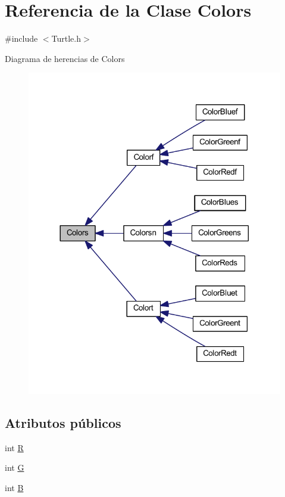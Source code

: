 \hypertarget{class_colors}{}\section{Referencia de la Clase Colors}
\label{class_colors}


{\ttfamily \#include $<$Turtle.\+h$>$}



Diagrama de herencias de Colors
\nopagebreak
\begin{figure}[H]
\begin{center}
\leavevmode
\includegraphics[width=317pt]{class_colors__inherit__graph}
\end{center}
\end{figure}
\subsection*{Atributos públicos}
\begin{DoxyCompactItemize}
\item 
int \mbox{\hyperlink{class_colors_a40ea32cca218e70d542afbac54daa803}{R}}
\item 
int \mbox{\hyperlink{class_colors_a87292ebcf4f2d4099e5e57e47dba81f3}{G}}
\item 
int \mbox{\hyperlink{class_colors_a05f5159cf285fcd2c8869fb0b38409e1}{B}}
\end{DoxyCompactItemize}


